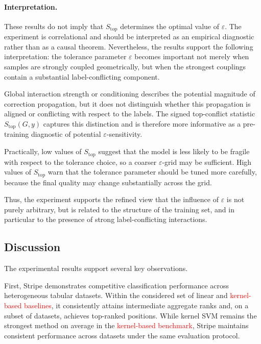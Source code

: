 \documentclass[a4paper,fleqn]{cas-sc}
\begin{document}
\paragraph{Interpretation.}

These results do not imply that $S_{\mathrm{top}}$ determines the optimal value of $\varepsilon$. The experiment is correlational and should be interpreted as an empirical diagnostic rather than as a causal theorem. Nevertheless, the results support the following interpretation: the tolerance parameter $\varepsilon$ becomes important not merely when samples are strongly coupled geometrically, but when the strongest couplings contain a substantial label-conflicting component.

Global interaction strength or conditioning describes the potential magnitude of correction propagation, but it does not distinguish whether this propagation is aligned or conflicting with respect to the labels. The signed top-conflict statistic $S_{\mathrm{top}}(G,y)$ captures this distinction and is therefore more informative as a pre-training diagnostic of potential $\varepsilon$-sensitivity.

Practically, low values of $S_{\mathrm{top}}$ suggest that the model is less likely to be fragile with respect to the tolerance choice, so a coarser $\varepsilon$-grid may be sufficient. High values of $S_{\mathrm{top}}$ warn that the tolerance parameter should be tuned more carefully, because the final quality may change substantially across the grid.

Thus, the experiment supports the refined view that the influence of $\varepsilon$ is not purely arbitrary, but is related to the structure of the training set, and in particular to the presence of strong label-conflicting interactions.


\subsection{Discussion}

The experimental results support several key observations.

First, Stripe demonstrates competitive classification performance across heterogeneous tabular datasets.
Within the considered set of linear and \textcolor{red}{kernel-based baselines}, it consistently attains intermediate aggregate ranks and, on a subset of datasets, achieves top-ranked positions.
While kernel SVM remains the strongest method on average in the \textcolor{red}{kernel-based benchmark}, Stripe maintains consistent performance across datasets under the same evaluation protocol.
\end{document}
